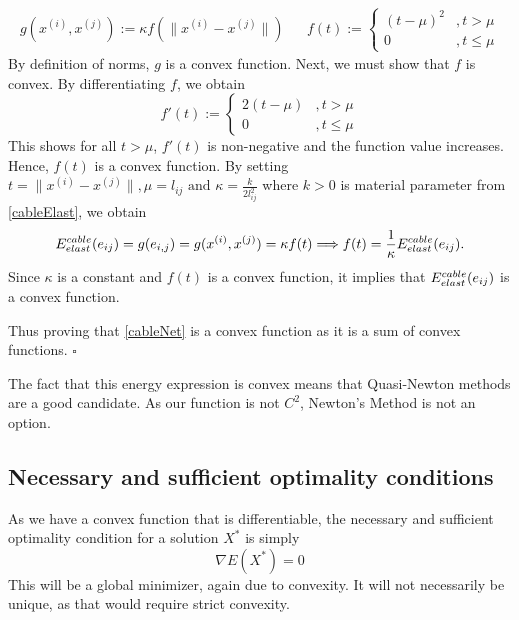 \begin{align*}
    g(x^{(i)},x^{(j)}) := \kappa f(\|x^{(i)} - x^{(j)}\|) && 
    f(t) := \begin{cases}
            (t - \mu)^2  & , t > \mu \\
            0           & , t \leq \mu
            \end{cases}
\end{align*}
By definition of norms, $g$ is a convex function. Next, we must show that $f$ is convex.
By differentiating $f$, we obtain 
$$
f'(t) := \begin{cases}
        2(t-\mu) &, t > \mu \\
        0       &, t \leq \mu
        \end{cases}
$$ 
This shows for all $t > \mu$, $f'(t)$ is non-negative and the function value increases. Hence, $f(t)$ is a convex function. By setting 
$t = \|x^{(i)} - x^{(j)}\|, \mu = l_{ij} \text{ and } \kappa = \frac{k}{2l^2_{ij}}$ where $k > 0$ is material parameter from \eqref{cableElast}, we obtain 
\begin{equation*}
    E^{cable}_{elast}(e_{ij}) = g(e_{i, j}) = g(x^{(i)}, x^{(j)}) = \kappa f(t) \Longrightarrow f(t) = \frac{1}{\kappa} E^{cable}_{elast}(e_{ij}).  
\end{equation*} 
Since $\kappa$ is a constant and $f(t)$ is a convex function, it implies that $E^{cable}_{elast}(e_{ij})$ is a convex function.

Thus proving that \eqref{cableNet} is a convex function as it is a sum of convex functions. \hfill $\square$

The fact that this energy expression is convex means that Quasi-Newton methods are a good candidate. As our function is not $C^2$, Newton's Method is not an option. 

\subsection{Necessary and sufficient optimality conditions}
As we have a convex function that is differentiable, the necessary and sufficient optimality condition for a solution $X^*$ is simply \begin{equation}
    \nabla E(X^*) = 0
\end{equation}
This will be a global minimizer, again due to convexity. It will not necessarily be unique, as that would require strict convexity.








